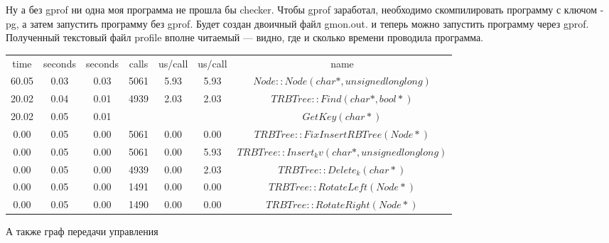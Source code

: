 Ну а без gprof ни одна моя программа не прошла бы checker.
Чтобы gprof заработал, необходимо скомпилировать программу с ключом -pg, а затем запустить программу без gprof. Будет создан двоичный файл gmon.out. и теперь можно запустить программу через gprof. Полученный текстовый файл profile вполне читаемый — видно, где и сколько времени проводила программа. 

\begin{center}
\begin{table}[h]

\label{tabular:times}
\begin{tabular}{c|c|c|c|c|c|c}

time  & seconds &  seconds  &  calls  & us/call & us/call & name   \\
 
  
 60.05  &    0.03 &    0.03  &   5061  &   5.93  &   5.93 & $Node::Node(char*, unsigned long long)$ \\
 20.02  &    0.04 &    0.01  &   4939  &   2.03  &   2.03 & $TRBTree::Find(char*, bool*)$ \\
 20.02   &   0.05 &    0.01  &         &         &        & $GetKey(char*)$ \\
  0.00   &   0.05 &    0.00  &   5061  &   0.00  &   0.00 & $TRBTree::FixInsertRBTree(Node*)$  \\
  0.00   &   0.05 &    0.00  &   5061  &   0.00  &   5.93 & $TRBTree::Insert_kv(char*, unsigned long long)$ \\
  0.00   &   0.05 &    0.00  &   4939  &   0.00  &   2.03 & $TRBTree::Delete_k(char*)$ \\
  0.00   &   0.05 &    0.00  &   1491  &   0.00  &   0.00 & $TRBTree::RotateLeft(Node*)$ \\
  0.00   &   0.05 &    0.00  &   1490  &   0.00  &   0.00 & $TRBTree::RotateRight(Node*)$ \\

\end{tabular}
\end{table}
\end{center}
А также граф передачи управления

